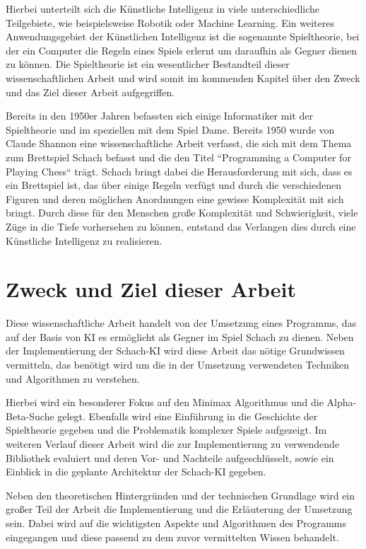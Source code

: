 Hierbei unterteilt sich die Künstliche Intelligenz in viele unterschiedliche Teilgebiete, wie beispielsweise Robotik oder Machine Learning. Ein weiteres Anwendungsgebiet der Künstlichen Intelligenz ist die sogenannte Spieltheorie, bei der ein Computer die Regeln eines Spiels erlernt um daraufhin als Gegner dienen zu können. Die Spieltheorie ist ein wesentlicher Bestandteil dieser wissenschaftlichen Arbeit und wird somit im kommenden Kapitel über den Zweck und das Ziel dieser Arbeit aufgegriffen.

Bereits in den 1950er Jahren befassten sich einige Informatiker mit der Spieltheorie und im speziellen mit dem Spiel Dame. Bereits 1950 wurde von Claude Shannon eine wissenschaftliche Arbeit verfasst, die sich mit dem Thema zum Brettspiel Schach befasst und die den Titel ``Programming a Computer for Playing Chess`` trägt.\cite{Shannon1950} Schach bringt dabei die Herausforderung mit sich, dass es ein Brettspiel ist, das über einige Regeln verfügt und durch die verschiedenen Figuren und deren möglichen Anordnungen eine gewisse Komplexität mit sich bringt. Durch diese für den Menschen große Komplexität und Schwierigkeit, viele Züge in die Tiefe vorhersehen zu können, entstand das Verlangen dies durch eine Künstliche Intelligenz zu realisieren.


\section{Zweck und Ziel dieser Arbeit}\label{zweck_und_ziel}
Diese wissenschaftliche Arbeit handelt von der Umsetzung eines Programms, das auf der Basis von KI es ermöglicht als Gegner im Spiel Schach zu dienen. Neben der Implementierung der Schach-KI wird diese Arbeit das nötige Grundwissen vermitteln, das benötigt wird um die in der Umsetzung verwendeten Techniken und Algorithmen zu verstehen. 

Hierbei wird ein besonderer Fokus auf den Minimax Algorithmus und die Alpha-Beta-Suche gelegt. Ebenfalls wird eine Einführung in die Geschichte der Spieltheorie gegeben und die Problematik komplexer Spiele aufgezeigt. Im weiteren Verlauf dieser Arbeit wird die zur Implementierung zu verwendende Bibliothek evaluiert und deren Vor- und Nachteile aufgeschlüsselt, sowie ein Einblick in die geplante Architektur der Schach-KI gegeben.

Neben den theoretischen Hintergründen und der technischen Grundlage wird ein großer Teil der Arbeit die Implementierung und die Erläuterung der Umsetzung sein. Dabei wird auf die wichtigsten Aspekte und Algorithmen des Programms eingegangen und diese passend zu dem zuvor vermittelten Wissen behandelt. 

